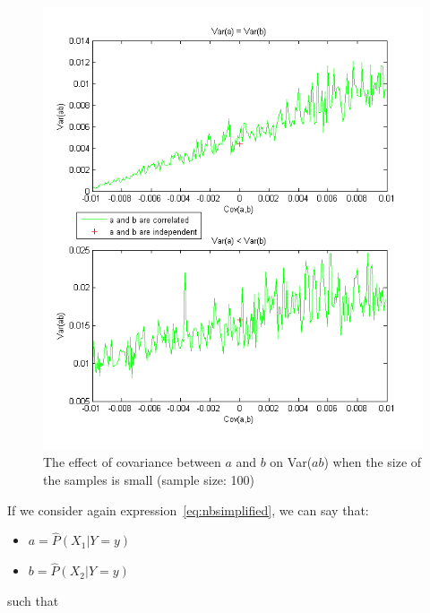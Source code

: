 \newpage
\begin{figure}[h]
\centering
\includegraphics[scale=0.70]{img/varabss100.png}
\caption{The effect of covariance between $a$ and $b$ on Var($ab$) when the size of the samples is small (sample size: 100)}
\label{fig:varabss100}
\end{figure}

If we consider again expression~\ref{eq:nbsimplified}, we can say that:

\begin{itemize}
\item $a=\hat{P}(X_1|Y=y)$
\item $b=\hat{P}(X_2|Y=y)$
\end{itemize}

such that


